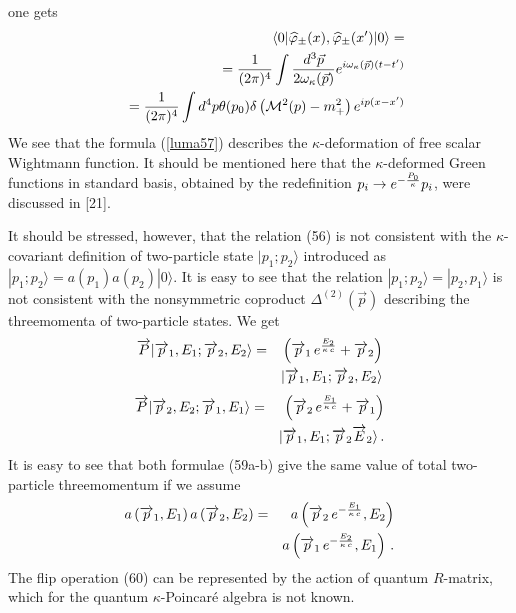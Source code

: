 \documentclass[a4paper,a4paper]{article}
\begin{document}
one gets
\begin{eqnarray}\label{luma57}
&&  \langle 0 | \widehat{\varphi}_{\pm} (x),
  \widehat{\varphi}_{\pm} (x^{\prime}) |0 \rangle  =
\\
&&
  =
  {1\over (2\pi)^{4}}
  \int {d^{3} \vec{p}\over 2\omega_{\kappa}(\vec{p})}
e^{i\omega_{\kappa} (\vec{p})(t-t^{\prime})}
  \cr
 && = {1\over (2\pi)^{4}}
\int d^{4} p \theta(p_{0})\delta
\left( {\cal M}^{2}(p)
 - m^{2}_{+} \right)
 e^{ip(x-x^{\prime})}
\nonumber
\end{eqnarray}
We see that the formula (\ref{luma57}) describes the
$\kappa$-deformation of free scalar Wightmann function. It should be
mentioned here that the $\kappa$-deformed Green functions in
standard basis, obtained by the redefinition $p_{i}\to e^{ -
{P_{0}\over \kappa}} p_{i}$, were  discussed in [21].


It should be stressed, however, that the relation (56) is not
consistent with the $\kappa$-covariant definition of two-particle state
$| p_{1};p_{2}\rangle$
 introduced as
$| p_{1};p_{2}\rangle = a (p_{1})a(p_{2})|0\rangle$.
It is easy to see that the relation
$|p_{1};p_{2}\rangle=|p_{2},p_{1}\rangle$
 is not consistent with
  the nonsymmetric coproduct $\Delta^{(2)}(\overrightarrow{p})$ describing
   the threemomenta of two-particle states.
We get
\renewcommand{\theequation}{59\alph{equation}}
\setcounter{equation}{0}
    \begin{eqnarray}
    \overrightarrow{P} | \overrightarrow{p}_{1},E_{1};
    \overrightarrow{p}_{2},E_{2}\rangle
&=& \left(
 \overrightarrow{p}_{1}\, e^{{ E_{2}\over \kappa\, c}}
+  \overrightarrow{p}_{2}
 \right)
\cr
&&
|
 \overrightarrow{p}_{1}, E_{1}; \overrightarrow{p}_{2},E_{2}
\rangle
\end{eqnarray}
 \begin{eqnarray}
    \overrightarrow{P}
|\overrightarrow{p}_{2},E_{2};
    \overrightarrow{p}_{1},E_{1}
\rangle
&=& \left(
\overrightarrow{p}_{2}\, e^{{ E_{1}\over \kappa\, c}}
+ \overrightarrow{p}_{1}
   \right)
\cr
&&
|
\overrightarrow{p}_{1},E_{1};\overrightarrow{p}_{2}
\overrightarrow{E}_{2}
\rangle \, .
\end{eqnarray}
\renewcommand{\theequation}{\arabic{equation}}
\setcounter{equation}{59}
It is easy to see that
both  formulae (59a-b) give the same value of
total two-particle
 threemomentum if we assume
\begin{eqnarray}\label{luma60}
  a\left(
  \overrightarrow{p}_{1},E_{1}\right)
  a\left(\overrightarrow{p}_{2},E_{2}\right)
&  = & a\left( \overrightarrow{p}_{2}\,
  e^{ - {E_{1}\over \kappa \, c}}, E_{2}\right)
\\
&&
a\left( \overrightarrow{p}_{1}\,
  e^{ - {E_{2}\over \kappa \, c}}, E_{1}\right)\, .
\nonumber
\end{eqnarray}
The flip operation (60) can be represented by the action of
quantum $R$-matrix,
which for the quantum $\kappa$-Poincar\'{e} algebra
is not known.
\end{document}
